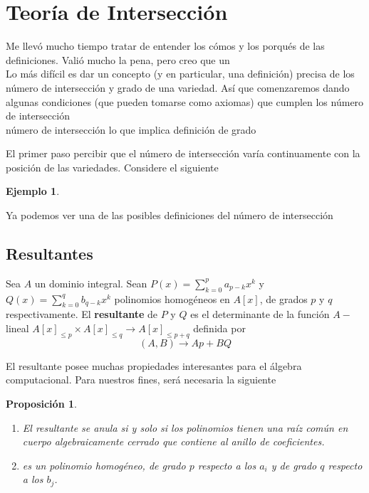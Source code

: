 \documentclass[12pt]{book}
\newtheorem{eje}{Ejemplo}
\newtheorem{pro}{Proposición}
\begin{document}
\section{Teoría de Intersección}


Me llevó mucho tiempo tratar de entender los cómos y los porqués de las definiciones. Valió mucho la pena, pero creo que un\\
Lo más difícil es dar un concepto (y en particular, una definición) precisa de los número de intersección y grado de una variedad.
Así que comenzaremos dando algunas condiciones (que pueden tomarse como axiomas) que cumplen los número de intersección\\

número de intersección lo que implica definición de grado

El primer paso percibir que el número de intersección varía continuamente con la posición de las variedades. Considere el siguiente

\begin{eje}
\end{eje}

Ya podemos ver una de las posibles definiciones del número de intersección


\subsection{Resultantes}

Sea $A$ un dominio integral. Sean $P(x)= \sum^p_{k=0} a_{p-k} x^k$ y $Q(x)= \sum^q_{k=0} b_{q-k} x^k$ polinomios homogéneos en $A[x]$, de grados $p$ y $q$ respectivamente. El \textbf{resultante} de $P$ y $Q$ es el determinante de la función $A-$lineal $A[x]_{\leq p} \times A[x]_{\leq q} \rightarrow A[x]_{\leq p+q}$ definida por $$ (A,B) \rightarrow Ap+BQ $$

El resultante posee muchas propiedades interesantes para el álgebra computacional. Para nuestros fines, será necesaria la siguiente 

\begin{pro}
\begin{enumerate}
\item El resultante se anula si y solo si los polinomios tienen una raíz común en cuerpo algebraicamente cerrado que contiene al anillo de coeficientes.
\item es un polinomio homogéneo, de grado $p$ respecto a los $a_i$ y de grado $q$ respecto a los $b_j$.

\end{enumerate}
\end{pro}
\end{document}
